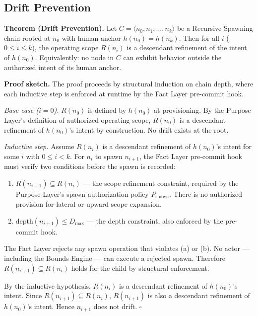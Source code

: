\subsection{Drift Prevention}
\label{sec:rs-drift-prevention}

\noindent\textbf{Theorem (Drift Prevention).} Let $C = \langle n_0, n_1, \ldots, n_k \rangle$ be a Recursive Spawning chain rooted at $n_0$ with human anchor $h(n_0) = h(n_k)$. Then for all $i$ ($0 \leq i \leq k$), the operating scope $R(n_i)$ is a descendant refinement of the intent of $h(n_0)$. Equivalently: no node in $C$ can exhibit behavior outside the authorized intent of its human anchor.

\medskip
\noindent\textbf{Proof sketch.} The proof proceeds by structural induction on chain depth, where each inductive step is enforced at runtime by the Fact Layer pre-commit hook.

\medskip
\textit{Base case ($i=0$).} $R(n_0)$ is defined by $h(n_0)$ at provisioning. By the Purpose Layer's definition of authorized operating scope, $R(n_0)$ is a descendant refinement of $h(n_0)$'s intent by construction. No drift exists at the root.

\medskip
\textit{Inductive step.} Assume $R(n_i)$ is a descendant refinement of $h(n_0)$'s intent for some $i$ with $0 \leq i < k$. For $n_i$ to spawn $n_{i+1}$, the Fact Layer pre-commit hook must verify two conditions before the spawn is recorded:

\begin{enumerate}
    \item[(a)] $R(n_{i+1}) \subseteq R(n_i)$ — the scope refinement constraint, required by the Purpose Layer's spawn authorization policy $P_{\mathrm{spawn}}$. There is no authorized provision for lateral or upward scope expansion.
    \item[(b)] $\mathrm{depth}(n_{i+1}) \leq D_{\mathrm{max}}$ — the depth constraint, also enforced by the pre-commit hook.
\end{enumerate}

The Fact Layer rejects any spawn operation that violates (a) or (b). No actor — including the Bounds Engine — can execute a rejected spawn. Therefore $R(n_{i+1}) \subseteq R(n_i)$ holds for the child by structural enforcement.

By the inductive hypothesis, $R(n_i)$ is a descendant refinement of $h(n_0)$'s intent. Since $R(n_{i+1}) \subseteq R(n_i)$, $R(n_{i+1})$ is also a descendant refinement of $h(n_0)$'s intent. Hence $n_{i+1}$ does not drift. $\square$

